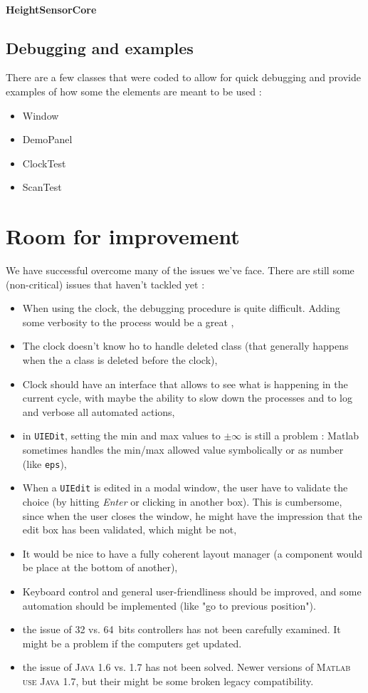 \documentclass[10pt,letter,twoside]{report}
\begin{document}
	\subsubsection{HeightSensorCore}


\section{Debugging and examples}
There are a few classes that were coded to allow for quick debugging and provide examples of how some the elements are meant to be used :
\begin{itemize}
\item Window
\item DemoPanel
\item ClockTest
\item ScanTest
\end{itemize}


\chapter{Room for improvement}
We have successful overcome many of the issues we've face. There are still some (non-critical) issues that haven't tackled yet :
\begin{itemize}
\item When using the clock, the debugging procedure is quite difficult. Adding some verbosity to the process would be a great ,
\item The clock doesn't know ho to handle deleted class (that generally happens when the a class is deleted before the clock),
\item Clock should have an interface that allows to see what is happening in the current cycle, with maybe the ability to slow down the processes and to log and verbose all automated actions,
\item in \verb!UIEDit!, setting the min and max values to $\pm\infty$ is still a problem : Matlab sometimes handles the min/max allowed value symbolically or as number (like \verb!eps!),
\item When a \verb!UIEdit! is edited in a modal window, the user have to validate the choice (by hitting \emph{Enter} or clicking in another box). This is cumbersome, since when the user closes the window, he might have the impression that the edit box has been validated, which might be not,
\item It would be nice to have a fully coherent layout manager (a component would be place at the bottom of another),
\item Keyboard control and general user-friendliness should be improved, and some automation should be implemented (like "go to previous position").
\item the issue of 32 vs. 64~bits controllers has not been carefully examined. It might be a problem if the computers get updated.
\item the issue of \textsc{Java} 1.6 vs. 1.7 has not been solved. Newer versions of \textsc{Matlab use} \textsc{Java} 1.7, but their might be some broken legacy compatibility.
\end{itemize}
\end{document}
